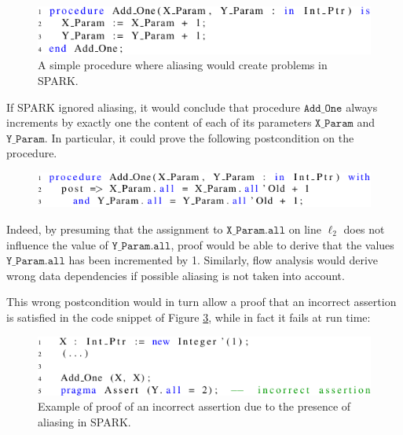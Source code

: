 \documentclass{llncs}
\newcommand\var[1]{\ensuremath{\mathtt{#1}}}
\begin{document}
\begin{figure}[htb!]
\centering
  \captionsetup{justification=centering,margin=0.6cm}
   \includegraphics[]{spark_ex1}
   \caption{A simple procedure where aliasing would create problems in SPARK.}
   \label{fig:spark_ex1}
\end{figure}
   
If SPARK ignored aliasing, it would conclude that procedure \var{Add\_One} always increments by exactly one the content of each of its parameters \var{X\_Param} and \var{Y\_Param}.
In particular, it could prove the following postcondition on the procedure.
 
\begin{figure}[htb!]
\centering
  \captionsetup{justification=centering,margin=0.6cm}
   \includegraphics[]{spark_ex1_proof}
   \label{fig:spark_ex1_proof}
\end{figure}

Indeed, by presuming that the assignment to \var{X\_Param.all} on line $\ell_2$ does not influence the value of \var{Y\_Param.all}, proof would be able to
derive that the values \var{Y\_Param.all} has been incremented by 1. Similarly, flow analysis would derive wrong data dependencies if possible aliasing is not taken into account.

This wrong postcondition would in turn allow a proof that an incorrect assertion is satisfied in the code snippet of Figure \ref{fig:spark_ex1_exp}, while in fact it fails at run time:

\begin{figure}[htb!]
\centering
  \captionsetup{justification=centering,margin=0.6cm}
   \includegraphics[]{spark_ex1_exp}
	\caption{Example of proof of an incorrect assertion due to the presence of aliasing in SPARK.}
   \label{fig:spark_ex1_exp}
\end{figure}
\end{document}
